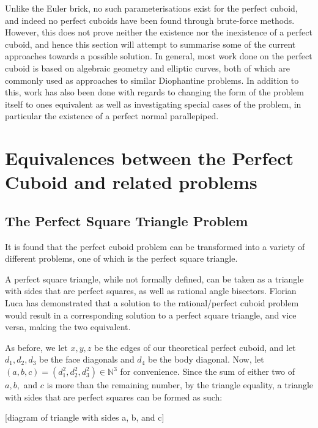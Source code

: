 \documentclass[11pt]{article}
\begin{document}
Unlike the Euler brick, no such parameterisations exist for the perfect cuboid, and indeed no perfect cuboids have been found through brute-force methods. However, this does not prove neither the existence nor the inexistence of a perfect cuboid, and hence this section will attempt to summarise some of the current approaches towards a possible solution. In general, most work done on the perfect cuboid is based on algebraic geometry and elliptic curves, both of which are commonly used as approaches to similar Diophantine problems. In addition to this, work has also been done with regards to changing the form of the problem itself to ones equivalent as well as investigating special cases of the problem, in particular the existence of a perfect normal parallepiped.

\section{Equivalences between the Perfect Cuboid and related problems}
\subsection{The Perfect Square Triangle Problem}
It is found that the perfect cuboid problem can be transformed into a variety of different problems, one of which is the perfect square triangle.

A perfect square triangle, while not formally defined, can be taken as a triangle with sides that are perfect squares, as well as rational angle bisectors. Florian Luca has demonstrated that a solution to the rational/perfect cuboid problem would result in a corresponding solution to a perfect square triangle, and vice versa, making the two equivalent.

As before, we let $x, y, z$ be the edges of our theoretical perfect cuboid, and let $d_1, d_2, d_3$ be the face diagonals and $d_4$ be the body diagonal. Now, let $(a, b, c)=(d_1^2, d_2^2, d_3^2)\in{\mathbb{N}^3}$ for convenience. Since the sum of either two of $a, b,$ and $c$ is more than the remaining number, by the triangle equality, a triangle with sides that are perfect squares can be formed as such:

[diagram of triangle with sides a, b, and c] 
\end{document}
